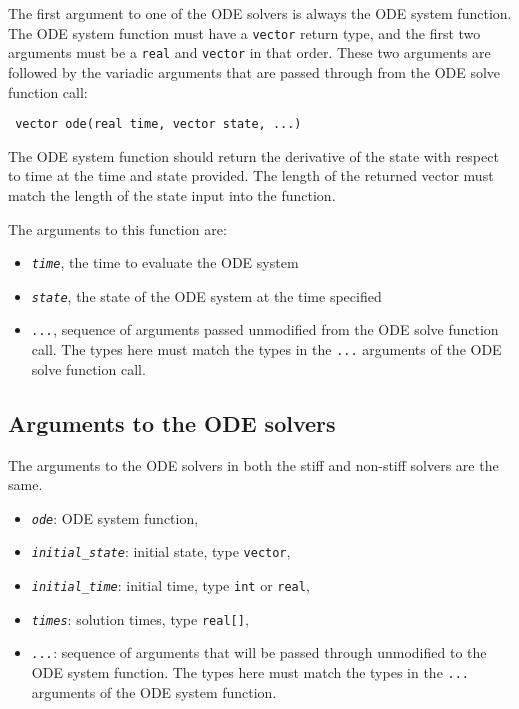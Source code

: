 \documentclass[
  10pt,
]{book}
\begin{document}
The first argument to one of the ODE solvers is always the ODE system
function. The ODE system function must have a \texttt{vector} return type, and the
first two arguments must be a \texttt{real} and \texttt{vector} in that order. These two
arguments are followed by the variadic arguments that are passed through from
the ODE solve function call:

\begin{verbatim}
 vector ode(real time, vector state, ...)
\end{verbatim}

The ODE system function should return the derivative of the state with
respect to time at the time and state provided. The length of the returned
vector must match the length of the state input into the function.

The arguments to this function are:

\begin{itemize}
\item
  \emph{\texttt{time}}, the time to evaluate the ODE system
\item
  \emph{\texttt{state}}, the state of the ODE system at the time specified
\item
  \emph{\texttt{...}}, sequence of arguments passed unmodified from the ODE solve
  function call. The types here must match the types in the \texttt{...} arguments of the
  ODE solve function call.
\end{itemize}

\hypertarget{arguments-to-the-ode-solvers}{%
\subsection{Arguments to the ODE solvers}\label{arguments-to-the-ode-solvers}}

The arguments to the ODE solvers in both the stiff and non-stiff solvers are the
same.

\begin{itemize}
\item
  \emph{\texttt{ode}}: ODE system function,
\item
  \emph{\texttt{initial\_state}}: initial state, type \texttt{vector},
\item
  \emph{\texttt{initial\_time}}: initial time, type \texttt{int} or \texttt{real},
\item
  \emph{\texttt{times}}: solution times, type \texttt{real{[}{]}},
\item
  \emph{\texttt{...}}: sequence of arguments that will be passed through unmodified
  to the ODE system function. The types here must match the types in the \texttt{...}
  arguments of the ODE system function.
\end{itemize}
\end{document}
